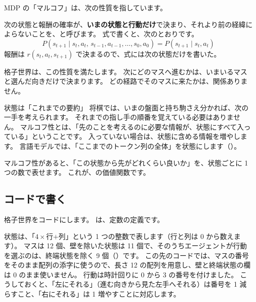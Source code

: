 MDP の「マルコフ」は、次の性質を指しています。

\begin{definition}[マルコフ性]\label{def:rlb-markov}
次の状態と報酬の確率が、\textbf{いまの状態と行動だけ}で決まり、それより前の経緯によらないことを、と呼びます。
式で書くと、次のとおりです。
\[
P(s_{t+1}\mid s_t,a_t,\,s_{t-1},a_{t-1},\dots,s_0,a_0)=P(s_{t+1}\mid s_t,a_t)
\]
報酬は $r(s_t,a_t,s_{t+1})$ で決まるので、式には次の状態だけを書いた。
\end{definition}

格子世界は、この性質を満たします。
次にどのマスへ進むかは、いまいるマスと選んだ向きだけで決まります。
どの経路でそのマスに来たかは、関係ありません。

\begin{intuition}{状態は「これまでの要約」}
将棋では、いまの盤面と持ち駒さえ分かれば、次の一手を考えられます。
それまでの指し手の順番を覚えている必要はありません。
マルコフ性とは、「先のことを考えるのに必要な情報が、状態にすべて入っている」ということです。
入っていない場合は、状態に含める情報を増やします。
言語モデルでは、「ここまでのトークン列の全体」を状態にします（）。
\end{intuition}

マルコフ性があると、「この状態から先がどれくらい良いか」を、状態ごとに 1 つの数で表せます。
これが、の価値関数です。

\subsection*{コードで書く}

格子世界をコードにします。
は、定数の定義です。


状態は、「$4\times$行$+$列」という 1 つの整数で表します（行と列は 0 から数えます）。
マスは 12 個、壁を除いた状態は 11 個で、そのうちエージェントが行動を選ぶのは、終端状態を除く 9 個（）です。
この先のコードでは、マスの番号をそのまま配列の添字に使うので、長さ 12 の配列を用意し、壁と終端状態の欄は 0 のまま使いません。
行動は時計回りに 0 から 3 の番号を付けました。
こうしておくと、「左にそれる」（進む向きから見た左手へそれる）は番号を 1 減らすこと、「右にそれる」は 1 増やすことに対応します。

